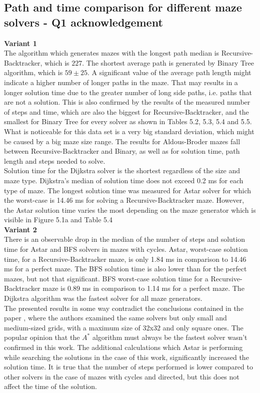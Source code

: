 \subsection{Path and time comparison for different maze solvers - Q1 acknowledgement}
\textbf{Variant 1}\\
\indent The algorithm which generates mazes with the longest path median is Recursive-Backtracker, which is $227$. The shortest average path is generated by
Binary Tree algorithm, which is $59\pm 25$. A significant value of the average path length might indicate a higher number of longer paths in the maze. That 
may results in a longer solution time due to the greater number of long side paths, i.e. paths that are not a solution. This is also confirmed by the results of
the measured number of steps and time, which are also the biggest for Recursive-Backtracker, and the smallest for Binary Tree for every solver as shown in
Tables 5.2, 5.3, 5.4 and 5.5. What is noticeable for this data set is a very big standard deviation, which might be caused by a big maze size range.
The results for Aldous-Broder mazes fall between Recursive-Backtracker and Binary, as well as for solution time, path length and steps needed to solve.\\
\indent Solution time for the Dijkstra solver is the shortest regardless of the size and maze type. Dijkstra's median of solution time does not exceed 0.2 ms for each type of maze.
The longest solution time was measured for Astar solver for which the worst-case is 14.46 ms for solving a Recursive-Backtracker maze.
However, the Astar solution time varies the most depending on the maze generator which is visible in Figure 5.1a and Table 5.4\\
\textbf{Variant 2}\\ 
\indent There is an observable drop in the median of the number of steps and solution time for Astar and BFS solvers in mazes with cycles. Astar, worst-case solution time, 
for a Recursive-Backtracker maze, is only 1.84 ms in comparison to 14.46 ms for a perfect maze. The BFS solution time is also lower than for the perfect mazes, but not
that significant. BFS worst-case solution time for a Recursive-Backtracker maze is 0.89 ms in comparison to 1.14 ms for a perfect maze. 
The Dijkstra algorithm was the fastest solver for all maze generators.\\
\indent The presented results in some way contradict the conclusions contained in the paper \cite{31}, where the authors examined the same solvers but 
only small and medium-sized grids, with a maximum size of 32x32 and only square ones. The popular opinion \cite{32} that the $A^*$ algorithm must always be the fastest solver wasn't
confirmed in this work. The additional calculations which Astar is performing while searching the solutions in the case of this work, significantly increased
the solution time. It is true that the number of steps performed is lower compared to other solvers in the case of mazes with cycles and directed,
but this does not affect the time of the solution.\\
